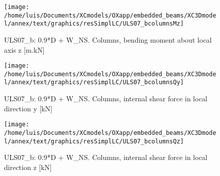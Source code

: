 \begin{figure}
\begin{center}
\texttt{[image: /home/luis/Documents/XCmodels/OXapp/embedded\_beams/XC3Dmodel/annex/text/graphics/resSimplLC/ULS07\_bcolumnsMz]}
\caption{ULS07_b: 0.9*D + W_NS. Columns, bending moment about local axis z [m.kN]}
\end{center}
\end{figure}
\begin{figure}
\begin{center}
\texttt{[image: /home/luis/Documents/XCmodels/OXapp/embedded\_beams/XC3Dmodel/annex/text/graphics/resSimplLC/ULS07\_bcolumnsQy]}
\caption{ULS07_b: 0.9*D + W_NS. Columns, internal shear force in local direction y [kN]}
\end{center}
\end{figure}
\begin{figure}
\begin{center}
\texttt{[image: /home/luis/Documents/XCmodels/OXapp/embedded\_beams/XC3Dmodel/annex/text/graphics/resSimplLC/ULS07\_bcolumnsQz]}
\caption{ULS07_b: 0.9*D + W_NS. Columns, internal shear force in local direction z [kN]}
\end{center}
\end{figure}
\clearpage
